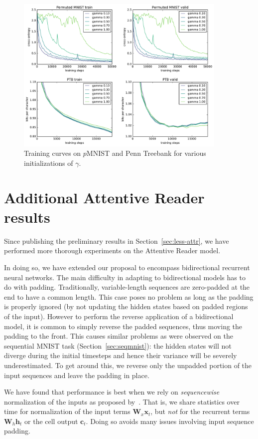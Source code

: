 \documentclass{article} %
\newcommand{\vect}[1]{\mathbf{#1}}
\newcommand{\mat}[1]{\mathbf{#1}}
\begin{document}
\begin{figure}%
\center
\includegraphics[width=0.9\textwidth]{figures/gammas.pdf}
\caption{Training curves on $p$MNIST and Penn Treebank for various initializations of $\gamma$.}
\label{fig:gammas}
\end{figure}

\section{Additional Attentive Reader results}
\label{sec:more-attr}

Since publishing the preliminary results in Section~\ref{sec:less-attr},
we have performed more thorough experiments on the Attentive Reader model.

In doing so, we have extended our proposal to encompass bidirectional recurrent neural networks.
The main difficulty in adapting to bidirectional models has to do with padding.
Traditionally, variable-length sequences are zero-padded at the end to have a common length.
This case poses no problem as long as the padding is properly ignored (by not updating the hidden states based on padded regions of the input).
However to perform the reverse application of a bidirectional model, it is common to simply reverse the padded sequences, thus moving the padding to the front.
This causes similar problems as were observed on the sequential MNIST task (Section~\ref{sec:seqmnist}): the hidden states will not diverge during the initial timesteps and hence their variance will be severely underestimated.
To get around this, we reverse only the unpadded portion of the input sequences and leave the padding in place.

We have found that performance is best when we rely on \emph{sequencewise} normalization of the inputs as proposed by~\citep{cesar,baidu}.
That is, we share statistics over time for normalization of the input terms $\mat{W}_x \vect{x}_t$,
but \emph{not} for the recurrent terms $\mat{W}_h \vect{h}_t$ or the cell output $\vect{c}_t$.
Doing so avoids many issues involving input sequence padding.
\end{document}
